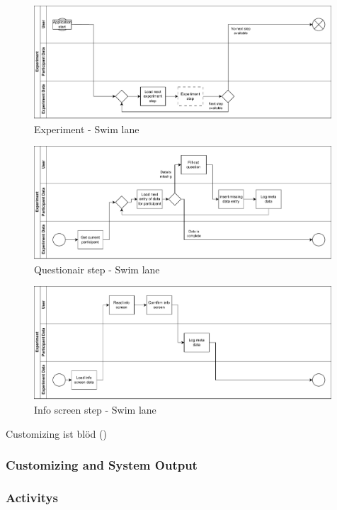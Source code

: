 \begin{figure}[htbp]
    \includegraphics[width=0.99\textwidth, keepaspectratio]{content/05_design_and_dev_artefacts/ExperimentSwimLane.drawio.pdf}
    \caption{Experiment - Swim lane}    
    \label{fig:experimentSwimLane}
\end{figure}

\begin{figure}[htbp]
    \includegraphics[width=0.99\textwidth, keepaspectratio]{content/05_design_and_dev_artefacts/QuestionairSwimLane.drawio.pdf}
    \caption{Questionair step - Swim lane}    
    \label{fig:questionairSwimLane}
\end{figure}

\begin{figure}[htbp]
    \includegraphics[width=0.99\textwidth, keepaspectratio]{content/05_design_and_dev_artefacts/InfoScreenSwimLane.drawio.pdf}
    \caption{Info screen step - Swim lane}    
    \label{fig:infoScreenSwimLane}
\end{figure}


Customizing ist blöd (\cite{Chou.2008})

\subsubsection{Customizing and System Output}

\subsubsection{Activitys}

